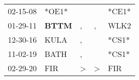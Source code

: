 \begin{supertabular}{p{0.07\textwidth}p{0.06\textwidth}p{0.02\textwidth}p{0.02\textwidth}p{0.06\textwidth}}
 02-15-08\textsuperscript{} &                            *OE1* &               &               &                   *CE1* \\
 01-29-11\textsuperscript{} &  \textbf{BTTM\textsuperscript{}} &             , &             , &  WLK2\textsuperscript{} \\
 12-30-16\textsuperscript{} &           KULA\textsuperscript{} &             , &               &                   *CS1* \\
 11-02-19\textsuperscript{} &           BATH\textsuperscript{} &             , &               &                   *CS1* \\
 02-29-20\textsuperscript{} &            FIR\textsuperscript{} &  \textgreater &  \textgreater &   FIR\textsuperscript{} \\
\end{supertabular}
